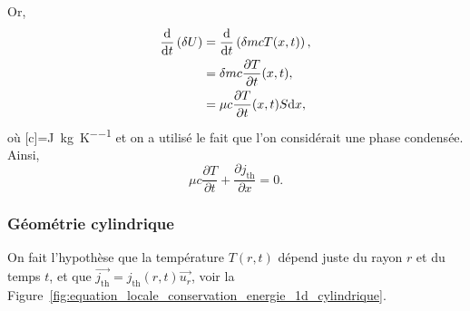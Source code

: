                Or,
                \begin{align}
                    \frac{\mathrm{d}}{\mathrm{d} t}\left(\delta U\right)
                    &=
                    \frac{\mathrm{d}}{\mathrm{d} t}\left(\delta m cT(x,t)\right),\\
                    &=
                    \delta m c\frac{\partial T}{\partial t}(x,t),\\
                    &=\mu c\frac{\partial T}{\partial t}(x,t) S\mathrm{d} x,
                \end{align}
                où [c]=\si{\joule\per\kilogram\per\kelvin} et on a utilisé le fait que l'on considérait une phase condensée. Ainsi,
                \begin{equation}
                    \boxed{
                        \mu c\frac{\partial T}{\partial t}+\frac{\partial j_{\text{th}}}{\partial x}=0.
                    }
                \end{equation}

        \subsubsection{Géométrie cylindrique}

            On fait l'hypothèse que la température $T(r,t)$ dépend juste du rayon $r$ et du temps $t$, et que $\vec{j_{\text{th}}}=j_{\text{th}}(r,t)\vec{u_r}$, voir la Figure~\ref{fig:equation_locale_conservation_energie_1d_cylindrique}.


